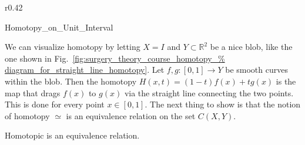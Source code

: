 \documentclass[crop=false,class=book,oneside]{standalone}
\begin{document}
            \begin{wrapfigure}[10]{r}{0.42\textwidth}
                \centering
                \vspace{-2ex}
                \captionsetup{type=figure}
                
                          {Homotopy_on_Unit_Interval}
                \caption{Straight-Line Homotopy.}
                \label{fig:surgery_theory_course_homotopy_diagram_%
                       for_straight_line_homotopy}
            \end{wrapfigure}
            We can visualize homotopy by letting $X=I$
            and $Y\subset\mathbb{R}^{2}$ be a nice blob,
            like the one shown in
            Fig.~\ref{fig:surgery_theory_course_homotopy_%
                      diagram_for_straight_line_homotopy}.
            Let $f,g:[0,1]\rightarrow Y$
            be smooth curves within the blob. Then the homotopy
            $H(x,t)=(1-t)f(x)+tg(x)$ is the map that drags $f(x)$
            to $g(x)$ via the straight line connecting the two
            points. This is done for every point $x\in [0,1]$.
            The next thing to show is that the notion of
            homotopy $\simeq$ is an equivalence relation on the
            set $C(X,Y)$.
            \begin{theorem}
                Homotopic is an equivalence relation.
            \end{theorem}
\end{document}
